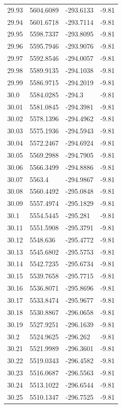 \begin{table}[H]
\begin{tabular}{llll}
29.93 & 5604.6089 & -293.6133 & -9.81 \\
29.94 & 5601.6718 & -293.7114 & -9.81 \\
29.95 & 5598.7337 & -293.8095 & -9.81 \\
29.96 & 5595.7946 & -293.9076 & -9.81 \\
29.97 & 5592.8546 & -294.0057 & -9.81 \\
29.98 & 5589.9135 & -294.1038 & -9.81 \\
29.99 & 5586.9715 & -294.2019 & -9.81 \\
30.0 & 5584.0285 & -294.3 & -9.81 \\
30.01 & 5581.0845 & -294.3981 & -9.81 \\
30.02 & 5578.1396 & -294.4962 & -9.81 \\
30.03 & 5575.1936 & -294.5943 & -9.81 \\
30.04 & 5572.2467 & -294.6924 & -9.81 \\
30.05 & 5569.2988 & -294.7905 & -9.81 \\
30.06 & 5566.3499 & -294.8886 & -9.81 \\
30.07 & 5563.4 & -294.9867 & -9.81 \\
30.08 & 5560.4492 & -295.0848 & -9.81 \\
30.09 & 5557.4974 & -295.1829 & -9.81 \\
30.1 & 5554.5445 & -295.281 & -9.81 \\
30.11 & 5551.5908 & -295.3791 & -9.81 \\
30.12 & 5548.636 & -295.4772 & -9.81 \\
30.13 & 5545.6802 & -295.5753 & -9.81 \\
30.14 & 5542.7235 & -295.6734 & -9.81 \\
30.15 & 5539.7658 & -295.7715 & -9.81 \\
30.16 & 5536.8071 & -295.8696 & -9.81 \\
30.17 & 5533.8474 & -295.9677 & -9.81 \\
30.18 & 5530.8867 & -296.0658 & -9.81 \\
30.19 & 5527.9251 & -296.1639 & -9.81 \\
30.2 & 5524.9625 & -296.262 & -9.81 \\
30.21 & 5521.9989 & -296.3601 & -9.81 \\
30.22 & 5519.0343 & -296.4582 & -9.81 \\
30.23 & 5516.0687 & -296.5563 & -9.81 \\
30.24 & 5513.1022 & -296.6544 & -9.81 \\
30.25 & 5510.1347 & -296.7525 & -9.81 \\

\end{tabular}
\end{table}
